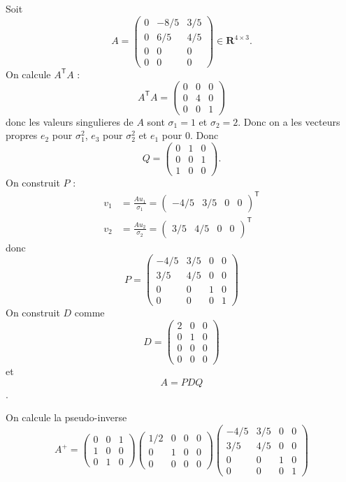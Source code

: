 \begin{example}
Soit
$$
A=\begin{pmatrix}
0 & -8/5 & 3/5 \\
0 & 6/5 & 4/5 \\
0 & 0 & 0 \\
0 & 0 & 0
\end{pmatrix}\in \mathbf{R}^{4\times3}.
$$
On calcule $A^{\mathsf{T}}A$ :
$$
A^{\mathsf{T}}A=\begin{pmatrix}
0 & 0 & 0 \\
0 & 4 & 0 \\
0 & 0 & 1
\end{pmatrix}
$$
donc les valeurs singulieres de $A$ sont $\sigma_{1}=1$ et $\sigma_{2}=2$. Donc on a les vecteurs propres $e_{2}$ pour $\sigma_{1}^{2}$, $e_{3}$ pour $\sigma_{2}^{2}$ et $e_{1}$ pour 0. Donc
$$
Q=\begin{pmatrix}
0 & 1 & 0 \\
0 & 0 & 1 \\
1 & 0 & 0
\end{pmatrix}.
$$
On construit $P$ :
\begin{align*}
v_{1} & =\frac{Au_{1}}{\sigma_{1}}=\begin{pmatrix}
-4/5 & 3/5 & 0 & 0 
\end{pmatrix}^{\mathsf{T}} \\
v_{2} & =\frac{Au_{2}}{\sigma _{2}}=\begin{pmatrix}
3/5 & 4/5 & 0 & 0
\end{pmatrix}^{\mathsf{T}}
\end{align*}
donc 
$$
P=\begin{pmatrix}
-4/5 & 3/5 & 0 & 0 \\
3/5 & 4/5 & 0 & 0 \\
0 & 0 & 1 & 0 \\
0 & 0 & 0 & 1
\end{pmatrix}
$$
On construit $D$ comme
$$
D=\begin{pmatrix}
2 & 0 & 0  \\
0 & 1 & 0 \\
0 & 0 & 0 \\
0 & 0 & 0
\end{pmatrix}
$$
et 
$$A=PDQ$$. 

On calcule la pseudo-inverse 
$$
A^{+}=\begin{pmatrix}
0 & 0 & 1 \\
1 & 0 & 0 \\
0 & 1 & 0 
\end{pmatrix}\begin{pmatrix}
1/2 & 0 & 0 & 0 \\
0 & 1 & 0 & 0 \\
0 & 0 & 0 & 0
\end{pmatrix}\begin{pmatrix}
-4/5 & 3/5 & 0 & 0 \\
3/5 & 4/5 & 0 & 0 \\
0 & 0 & 1 &0 \\
0 & 0 & 0 & 1 
\end{pmatrix}
$$
\end{example}
